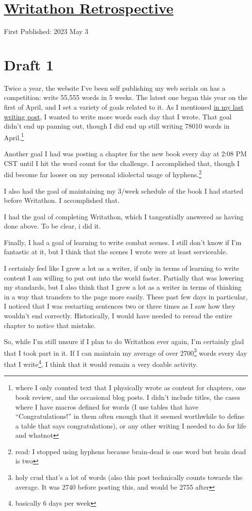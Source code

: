 \documentclass[12pt]{article}[titlepage]
\newcommand{\say}[1]{``#1''}
\newcommand{\1}{\={a}}
\newcommand{\2}{\={e}}
\newcommand{\3}{\={\i}}
\newcommand{\4}{\=o}
\newcommand{\5}{\=u}
\newcommand{\6}{\={A}}
\renewcommand{\,}{\textsuperscript{,}}
\begin{document}
\doublespacing
\section{\href{writathon-23-april.html}{Writathon Retrospective}}
First Published: 2023 May 3

\section{Draft 1}
Twice a year, the website I've been self publishing my web serials on has a competition: write 55,555 words in 5 weeks.
The latest one began this year on the first of April, and I set a variety of goals related to it.
As I mentioned \href{writing-3.html}{in my last writing post}, I wanted to write more words each day that I wrote.
That goal didn't end up panning out, though I did end up still writing 78010 words in April.\footnote{where I only counted text that I physically wrote as content for chapters, one book review, and the occasional blog posts. I didn't include titles, the cases where I have macros defined for words (I use tables that have \say{Congratulations!} in them often enough that it seemed worthwhile to define a table that says congratulations), or any other writing I needed to do for life and whatnot}

Another goal I had was posting a chapter for the new book every day at 2:08 PM CST until I hit the word count for the challenge.
I accomplished that, though I did become far looser on my personal idiolectal usage of hyphens.\footnote{read: I stopped using hyphens because brain-dead is one word but brain dead is two}

I also had the goal of maintaining my 3/week schedule of the book I had started before Writathon.
I accomplished that.

I had the goal of completing Writathon, which I tangentially answered as having done above.
To be clear, i did it.

Finally, I had a goal of learning to write combat scenes.
I still don't know if I'm fantastic at it, but I think that the scenes I wrote were at least serviceable.

I certainly feel like I grew a lot as a writer, if only in terms of learning to write content I am willing to put out into the world faster.
Partially that was lowering my standards, but I also think that I grew a lot as a writer in terms of thinking in a way that transfers to the page more easily.
These past few days in particular, I noticed that I was restarting sentences two or three times as I saw how they wouldn't end correctly.
Historically, I would have needed to reread the entire chapter to notice that mistake.

So, while I'm still unsure if I plan to do Writathon ever again, I'm certainly glad that I took part in it.
If I can maintain my average of over 2700\footnote{holy crud that's a lot of words (also this post technically counts towards the average. It was 2740 before posting this, and would be 2755 after} words every day that I write\footnote{basically 6 days per week}, I think that it would remain a very doable activity.
\end{document}
